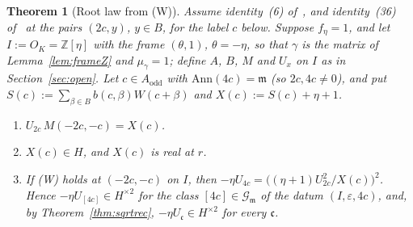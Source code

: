 \documentclass[11pt]{amsart}
\numberwithin{equation}{section}
\theoremstyle{plain}
\newtheorem{theorem}{Theorem}[section]
\theoremstyle{definition}
\theoremstyle{remark}
\begin{document}
\begin{theorem}[Root law from (W)]\label{thm:rootW}
Assume identity~(6) of~\cite{RW}, and identity~(36) of~\cite{RW} at the pairs \((2c,y)\), \(y\in B\), for the label \(c\) below. Suppose \(f_\eta=1\), and let \(I:=O_K=\mathbb Z[\eta]\) with the frame \((\theta,1)\), \(\theta=-\eta\), so that \(\gamma\) is the matrix of Lemma~\ref{lem:frameZ} and \(\mu_\gamma=1\); define \(A\), \(B\), \(M\) and \(U_x\) on \(I\) as in Section~\ref{sec:open}. Let \(c\in A_{\mathrm{odd}}\) with \(\mathrm{Ann}(4c)=\mathfrak m\) (so \(2c,4c\ne0\)), and put \(S(c):=\sum_{\beta\in B}b(c,\beta)W(c+\beta)\) and \(X(c):=S(c)+\eta+1\).
\begin{enumerate}
\item[(a)] \(U_{2c}\,M(-2c,-c)=X(c)\).
\item[(b)] \(X(c)\in H\), and \(X(c)\) is real at \(r\).
\item[(c)] If (W) holds at \((-2c,-c)\) on \(I\), then \(-\eta U_{4c}=\bigl((\eta+1)U_{2c}^2/X(c)\bigr)^2\). Hence \(-\eta U_{[4c]}\in H^{\times2}\) for the class \([4c]\in\mathcal G_{\mathfrak m}\) of the datum \((I,\varepsilon,4c)\), and, by Theorem~\ref{thm:sqrtrec}, \(-\eta U_{\mathfrak c}\in H^{\times2}\) for every \(\mathfrak c\).
\end{enumerate}
\end{theorem}
\end{document}
